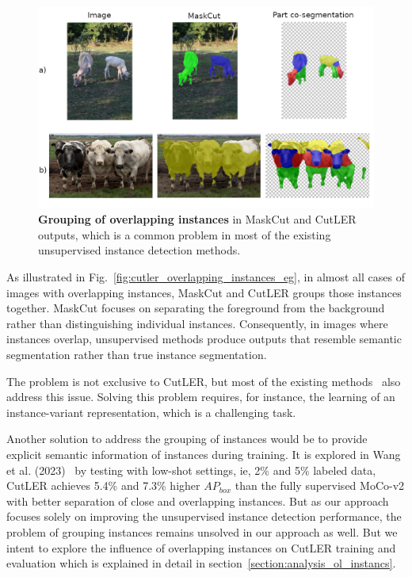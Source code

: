 \begin{figure}
	\centering
	\includegraphics[width=1\textwidth]{Images/main/part-cosegm.png}
	\caption[\textbf{Cutler's Performance on Images with Overlapping Instances}]{\textbf{Grouping of overlapping instances} in MaskCut and CutLER outputs, which is a common problem in most of the existing unsupervised instance detection methods.}
	\label{fig:maskcut_instance_indifference}
\end{figure}

As illustrated in Fig.~\ref{fig:cutler_overlapping_instances_eg}, in almost all cases of images with overlapping instances, MaskCut and CutLER groups those instances together. MaskCut focuses on separating the foreground from the background rather than distinguishing individual instances. Consequently, in images where instances overlap, unsupervised methods produce outputs that resemble semantic segmentation rather than true instance segmentation.

The problem is not exclusive to CutLER, but most of the existing methods~\cite{engstler2023understanding, cond1_support_2, Wang_2022_CVPR} also address this issue. Solving this problem requires, for instance, the learning of an instance-variant representation, which is a challenging task. 

Another solution to address the grouping of instances would be to provide explicit semantic information of instances during training. It is explored in Wang et al. (2023)~\cite{wang2023cut} by testing with low-shot settings, ie, 2\% and 5\% labeled data, CutLER achieves 5.4\% and 7.3\% higher \(AP_{box}\) than the fully supervised MoCo-v2 with better separation of close and overlapping instances. But as our approach focuses solely on improving the unsupervised instance detection performance, the problem of grouping instances remains unsolved in our approach as well. But we intent to explore the influence of overlapping instances on CutLER training and evaluation which is explained in detail in section~\ref{section:analysis_ol_instancs}.

